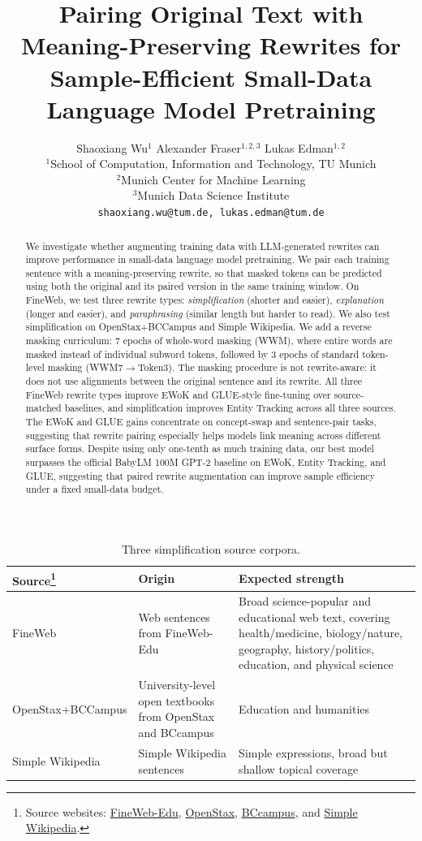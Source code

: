 \documentclass[11pt]{article}
\title{Pairing Original Text with Meaning-Preserving Rewrites for Sample-Efficient Small-Data Language Model Pretraining}
\author{Shaoxiang Wu$^{1}$ \qquad Alexander Fraser$^{1,2,3}$ \qquad Lukas Edman$^{1,2}$ \vspace{.2cm}\\
$^{1}$School of Computation, Information and Technology, TU Munich \\
$^{2}$Munich Center for Machine Learning \\
$^{3}$Munich Data Science Institute \\
\vspace{.1cm} {\tt \small shaoxiang.wu@tum.de, lukas.edman@tum.de}
}
\begin{document}
\maketitle

\begin{abstract}
We investigate whether augmenting training data with LLM-generated rewrites can improve performance in small-data language model pretraining. We pair each training sentence with a meaning-preserving rewrite, so that masked tokens can be predicted using both the original and its paired version in the same training window. On FineWeb, we test three rewrite types: \emph{simplification} (shorter and easier), \emph{explanation} (longer and easier), and \emph{paraphrasing} (similar length but harder to read). We also test simplification on OpenStax+BCCampus and Simple Wikipedia. We add a reverse masking curriculum: 7 epochs of whole-word masking (WWM), where entire words are masked instead of individual subword tokens, followed by 3 epochs of standard token-level masking (WWM7$\to$Token3). The masking procedure is not rewrite-aware: it does not use alignments between the original sentence and its rewrite. All three FineWeb rewrite types improve EWoK and GLUE-style fine-tuning over source-matched baselines, and simplification improves Entity Tracking across all three sources. The EWoK and GLUE gains concentrate on concept-swap and sentence-pair tasks, suggesting that rewrite pairing especially helps models link meaning across different surface forms. Despite using only one-tenth as much training data, our best model surpasses the official BabyLM 100M GPT-2 baseline on EWoK, Entity Tracking, and GLUE, suggesting that paired rewrite augmentation can improve sample efficiency under a fixed small-data budget.
\end{abstract}

\begin{table}[t]
\centering
\begin{minipage}{\textwidth}
\centering
\small
\begin{tabular}{p{3cm}p{4cm}p{7.5cm}}
\toprule
\textbf{Source}\footnote{Source websites: \href{https://huggingface.co/datasets/HuggingFaceFW/fineweb-edu}{FineWeb-Edu}, \href{https://openstax.org/subjects}{OpenStax}, \href{https://collection.bccampus.ca/}{BCcampus}, and \href{https://simple.wikipedia.org/}{Simple Wikipedia}.} & \textbf{Origin} & \textbf{Expected strength} \\
\midrule
FineWeb & Web sentences from FineWeb-Edu \citep{penedo2024fineweb} & Broad science-popular and educational web text, covering health/medicine, biology/nature, geography, history/politics, education, and physical science \\
OpenStax+BCCampus & University-level open textbooks from OpenStax and BCcampus & Education and humanities \\
Simple Wikipedia & Simple Wikipedia sentences & Simple expressions, broad but shallow topical coverage \\
\bottomrule
\end{tabular}
\caption{Three simplification source corpora.}
\label{tab:simp-sources}
\end{minipage}
\end{table}
\end{document}
